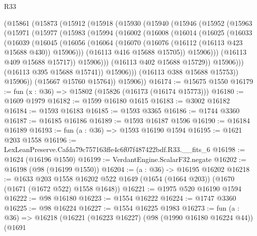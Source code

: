 \begin{lexlean}{R33}
\begin{coremodule}
      (@15861
        (@15873
          (@15912
            (@15918
              (@15930
                (@15940
                  (@15946
                    (@15952
                      (@15963
                        (@15971
                          (@15977
                            (@15983
                              (@15994
                                (@16002
                                  (@16008
                                    (@16014
                                      (@16025
                                        (@16033
                                          (@16039
                                            (@16045
                                              (@16056
                                                (@16064
                                                  (@16070
                                                    (@16076
                                                      (@16112 (@16113 @423 @15688 @430))
                                                      @15906)))
                                                (@16113 @416 @15688 @15705))
                                              @15906)))
                                        (@16113 @409 @15688 @15717))
                                      @15906)))
                                (@16113 @402 @15688 @15729))
                              @15906)))
                        (@16113 @395 @15688 @15741))
                      @15906)))
                (@16113 @388 @15688 @15753))
              @15906))
          (@15667 @15760 @15764))
        @15906))
@16174 := @15675 @1550
@16179 := fun (x : @36) => @15802 (@15826 (@16173 (@16174 @15773)))
@16180 := @1609 @1979
@16182 := @1599 @16180 @1615
@16183 := @3002 @16182
@16184 := @1593 @16183
@16185 := @1593 @3365
@16186 := @1744 @3360
@16187 := @16185 @16186
@16189 := @1593 @16187 @1596
@16190 := @16184 @16189
@16193 := fun (a : @36) => @1593 @16190 @1594
@16195 := @1621 @203 @1558
@16196 := LexLeanPreserve.Cafda79c757163ffe4c6f07f487422bdf.R33.__fits_6
@16198 := @1624 (@16196 @1550)
@16199 := VerdantEngine.ScalarF32.negate
@16202 := @16198 (@98 (@16199 @1550))
@16204 := (a : @36) -> @16195 @16202
@16218 := @1633
    @203
    @1558
    @16202
    @522
    @1649
    (@1654 (@1664 @203))
    (@1670 (@1671 (@1672 @522) @1558 @1648))
@16221 := @1975 @520 @16190 @1594
@16222 := @98 @16180
@16223 := @1554 @16222
@16224 := @1747 @3360
@16225 := @98 @16224
@16227 := @1554 @16225 @1983
@16273 := fun (a : @36) =>
  @16218
    (@16221
      (@16223 @16227)
      (@98 (@1990 @16180 @16224 @44))
      (@1691

\end{coremodule}
\end{lexlean}
